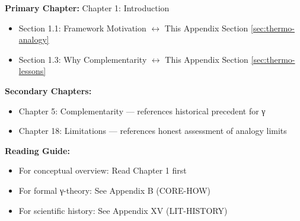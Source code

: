 %
%

%
%
%
%

\begin{tcolorbox}[colback=purple!5!white, colframe=purple!75!black,
    title=Chapter Linkage]

\textbf{Primary Chapter:} Chapter 1: Introduction
\begin{itemize}[nosep]
\item Section 1.1: Framework Motivation $\leftrightarrow$ This Appendix Section \ref{sec:thermo-analogy}
\item Section 1.3: Why Complementarity $\leftrightarrow$ This Appendix Section \ref{sec:thermo-lessons}
\end{itemize}

\textbf{Secondary Chapters:}
\begin{itemize}[nosep]
\item Chapter 5: Complementarity --- references historical precedent for γ
\item Chapter 18: Limitations --- references honest assessment of analogy limits
\end{itemize}

\textbf{Reading Guide:}
\begin{itemize}[nosep]
\item For conceptual overview: Read Chapter 1 first
\item For formal γ-theory: See Appendix B (CORE-HOW)
\item For scientific history: See Appendix XV (LIT-HISTORY)
\end{itemize}

\end{tcolorbox}

